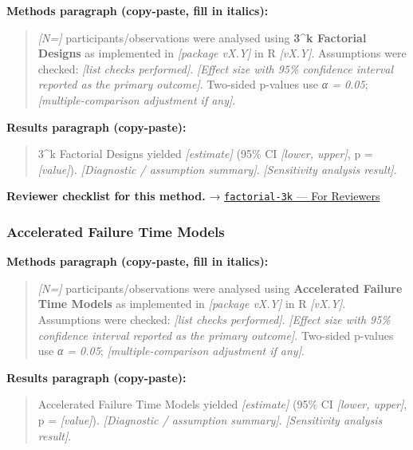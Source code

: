 \documentclass[
]{article}
\begin{document}
\textbf{Methods paragraph (copy-paste, fill in italics):}

\begin{quote}
\emph{{[}N={]}} participants/observations were analysed using
\textbf{3\^{}k Factorial Designs} as implemented in \emph{{[}package
vX.Y{]}} in R \emph{{[}vX.Y{]}}. Assumptions were checked: \emph{{[}list
checks performed{]}}. \emph{{[}Effect size with 95\% confidence interval
reported as the primary outcome{]}}. Two-sided p-values use \emph{α =
0.05}; \emph{{[}multiple-comparison adjustment if any{]}}.
\end{quote}

\textbf{Results paragraph (copy-paste):}

\begin{quote}
3\^{}k Factorial Designs yielded \emph{{[}estimate{]}} (95\% CI
\emph{{[}lower, upper{]}}, p = \emph{{[}value{]}}). \emph{{[}Diagnostic
/ assumption summary{]}}. \emph{{[}Sensitivity analysis result{]}}.
\end{quote}

\textbf{Reviewer checklist for this method.} →
\href{../chapters/16-design/factorial-3k.Rmd\#for-reviewers}{\texttt{factorial-3k}
--- For Reviewers}

\subsubsection{Accelerated Failure Time
Models}\label{accelerated-failure-time-models}

\textbf{Methods paragraph (copy-paste, fill in italics):}

\begin{quote}
\emph{{[}N={]}} participants/observations were analysed using
\textbf{Accelerated Failure Time Models} as implemented in
\emph{{[}package vX.Y{]}} in R \emph{{[}vX.Y{]}}. Assumptions were
checked: \emph{{[}list checks performed{]}}. \emph{{[}Effect size with
95\% confidence interval reported as the primary outcome{]}}. Two-sided
p-values use \emph{α = 0.05}; \emph{{[}multiple-comparison adjustment if
any{]}}.
\end{quote}

\textbf{Results paragraph (copy-paste):}

\begin{quote}
Accelerated Failure Time Models yielded \emph{{[}estimate{]}} (95\% CI
\emph{{[}lower, upper{]}}, p = \emph{{[}value{]}}). \emph{{[}Diagnostic
/ assumption summary{]}}. \emph{{[}Sensitivity analysis result{]}}.
\end{quote}
\end{document}
